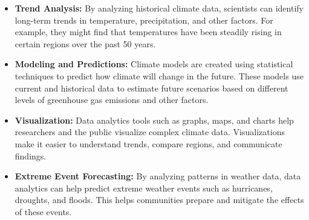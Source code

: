 \begin{itemize}
    \item \textbf{Trend Analysis:} By analyzing historical climate data, scientists can identify long-term trends in temperature, precipitation, and other factors. For example, they might find that temperatures have been steadily rising in certain regions over the past 50 years.
    \item \textbf{Modeling and Predictions:} Climate models are created using statistical techniques to predict how climate will change in the future. These models use current and historical data to estimate future scenarios based on different levels of greenhouse gas emissions and other factors.
    \item \textbf{Visualization:} Data analytics tools such as graphs, maps, and charts help researchers and the public visualize complex climate data. Visualizations make it easier to understand trends, compare regions, and communicate findings.
    \item \textbf{Extreme Event Forecasting:} By analyzing patterns in weather data, data analytics can help predict extreme weather events such as hurricanes, droughts, and floods. This helps communities prepare and mitigate the effects of these events.
\end{itemize}


